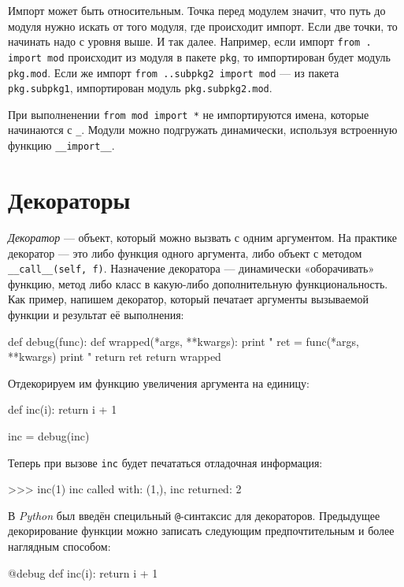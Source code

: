 Импорт может быть относительным. Точка перед модулем значит, что путь до модуля нужно искать от того модуля, где происходит импорт. Если две точки, то начинать надо с уровня выше. И так далее. Например, если импорт \lstinline{from . import mod} происходит из модуля в пакете \lstinline{pkg}, то импортирован будет модуль \lstinline{pkg.mod}. Если же импорт \lstinline{from ..subpkg2 import mod} --- из пакета \lstinline{pkg.subpkg1}, импортирован модуль \lstinline{pkg.subpkg2.mod}.

При выполненении \lstinline{from mod import *} не импортируются имена, которые начинаются с \lstinline{_}. Модули можно подгружать динамически, используя встроенную функцию \lstinline{__import__}.

\section{Декораторы}
\label{sec:py-decorators}
\emph{Декоратор} — объект, который можно вызвать с одним аргументом. На практике декоратор — это либо функция одного аргумента, либо объект с методом \lstinline{__call__(self, f)}. Назначение декоратора — динамически «оборачивать» функцию, метод либо класс в какую-либо дополнительную функциональность. Как пример, напишем декоратор, который печатает аргументы вызываемой функции и результат её выполнения:
\begin{pylst}{}{}
def debug(func):
    def wrapped(*args, **kwargs):
        print "%
        ret = func(*args, **kwargs)
        print "%
        return ret
    return wrapped
\end{pylst}

Отдекорируем им функцию увеличения аргумента на единицу:
\begin{pylst}{}{}
def inc(i):
    return i + 1

inc = debug(inc)
\end{pylst}

Теперь при вызове \lstinline{inc} будет печататься отладочная информация:
\begin{pylst}{}{}
>>> inc(1)
inc called with: (1,), {}
inc returned: 2
\end{pylst}

В \emph{Python} был введён специльный \lstinline{@}-синтаксис для декораторов. Предыдущее декорирование функции можно записать следующим предпочтительным и более наглядным способом:
\begin{pylst}{}{}
@debug
def inc(i):
    return i + 1
\end{pylst}

